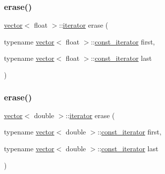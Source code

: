 \subsubsection{\texorpdfstring{erase()}{erase()}\hspace{0.1cm}{\footnotesize\ttfamily [26/28]}}
{\footnotesize\ttfamily \mbox{\hyperlink{classvector}{vector}}$<$ float $>$\+::\mbox{\hyperlink{classvector_a35c955cacac6aacaa1e82874b1628865}{iterator}} erase (\begin{DoxyParamCaption}\item[{typename \mbox{\hyperlink{classvector}{vector}}$<$ float $>$\+::\mbox{\hyperlink{classvector_a2fc97dce62b7053449cc868607540dba}{const\+\_\+iterator}}}]{first,  }\item[{typename \mbox{\hyperlink{classvector}{vector}}$<$ float $>$\+::\mbox{\hyperlink{classvector_a2fc97dce62b7053449cc868607540dba}{const\+\_\+iterator}}}]{last }\end{DoxyParamCaption})}

\mbox{\label{classvector_aedb912479ddd3d0430711f983b47d664}} 
\subsubsection{\texorpdfstring{erase()}{erase()}\hspace{0.1cm}{\footnotesize\ttfamily [27/28]}}
{\footnotesize\ttfamily \mbox{\hyperlink{classvector}{vector}}$<$ double $>$\+::\mbox{\hyperlink{classvector_a35c955cacac6aacaa1e82874b1628865}{iterator}} erase (\begin{DoxyParamCaption}\item[{typename \mbox{\hyperlink{classvector}{vector}}$<$ double $>$\+::\mbox{\hyperlink{classvector_a2fc97dce62b7053449cc868607540dba}{const\+\_\+iterator}}}]{first,  }\item[{typename \mbox{\hyperlink{classvector}{vector}}$<$ double $>$\+::\mbox{\hyperlink{classvector_a2fc97dce62b7053449cc868607540dba}{const\+\_\+iterator}}}]{last }\end{DoxyParamCaption})}

\mbox{\label{classvector_a89cfbc1cfa9c97cea5be305079b90b65}} 
